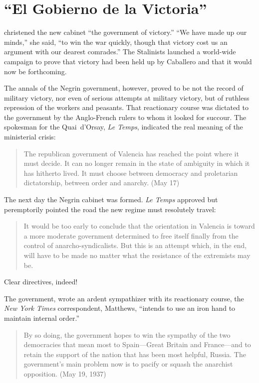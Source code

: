 \chapter{``El Gobierno de la Victoria''}

 christened the new cabinet ``the government of victory.'' ``We have made up our minds,'' she said, ``to win the war quickly, though that victory cost us an argument with our dearest comrades.'' The Stalinists launched a world-wide campaign to prove that victory had been held up by Caballero and that it would now be forthcoming.

The annals of the Negrin government, however, proved to be not the record of military victory, nor even of serious attempts at military victory, but of ruthless repression of the workers and peasants. That reactionary course was dictated to the government by the Anglo-French rulers to whom it looked for succour. The spokesman for the Quai~d’Orsay, \emph{Le Temps}, indicated the real meaning of the ministerial crisis:

\begin{quotation}
  The republican government of Valencia has reached the point where it must decide. It can no longer remain in the state of ambiguity in which it has hitherto lived. It must choose between democracy and proletarian dictatorship, between order and anarchy. (May 17)
\end{quotation}

The next day the Negrin cabinet was formed. \emph{Le Temps} approved but peremptorily pointed the road the new regime must resolutely travel:

\begin{quotation}
  It would be too early to conclude that the orientation in Valencia is toward a more moderate government determined to free itself finally from the control of anarcho-syndicalists. But this is an attempt which, in the end, will have to be made no matter what the resistance of the extremists may be.
\end{quotation}

Clear directives, indeed!

\medskip

The government, wrote an ardent sympathizer with its reactionary course, the \emph{New York Times} correspondent, Matthews, ``intends to use an iron hand to maintain internal order.''

\begin{quotation}
  By so doing, the government hopes to win the sympathy of the two democracies that mean most to Spain---Great Britain and France---and to retain the support of the nation that has been most helpful, Russia. The government’s main problem now is to pacify or squash the anarchist opposition. (May 19, 1937)
\end{quotation}

